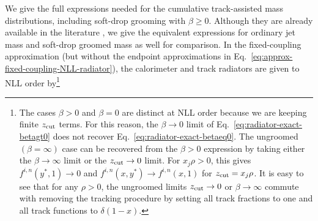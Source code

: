 \documentclass[letterpaper,11pt]{article}
\newcommand{\Eq}[1]{Eq.~\eqref{#1}}
\begin{document}
We give the full expressions needed for the cumulative track-assisted mass distributions, including soft-drop grooming with $\beta \ge 0$.
%
Although they are already available in the literature \cite{Larkoski:2014wba}, we give the equivalent expressions for ordinary jet mass and soft-drop groomed mass as well for comparison. 
%
In the fixed-coupling approximation (but without the endpoint approximations in \Eq{eq:approx-fixed-coupling-NLL-radiator}), the calorimeter and track radiators are given to NLL order by\footnote{The cases $\beta > 0$ and $\beta = 0$ are distinct at NLL order because we are keeping finite $z_{\rm cut}$ terms. For this reason, the $\beta\rightarrow 0$ limit of \Eq{eq:radiator-exact-betagt0} does not recover \Eq{eq:radiator-exact-betaeq0}. The ungroomed $(\beta=\infty)$ case can be recovered from the $\beta > 0$ expression by taking either the $\beta\rightarrow \infty$ limit or the $z_{\rm cut} \rightarrow 0$ limit. For $x_j\rho>0$, this gives $f^{i,n}(y^*,1) \rightarrow 0$ and $f^{i,n}(x,y^*) \rightarrow f^{i,n}(x,1)$ for $z_{\rm cut} = x_j\rho$. It is easy to see that for any $\rho>0$, the ungroomed limits $z_{\rm cut}\rightarrow 0$ or $\beta\rightarrow \infty$ commute with removing the tracking procedure by setting all track fractions to one and all track functions to $\delta(1-x)$. }
\end{document}
